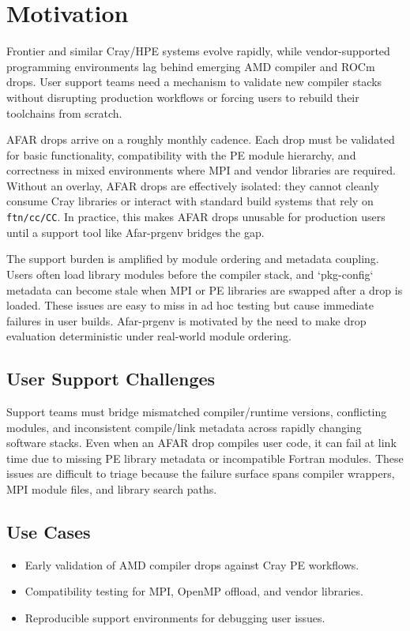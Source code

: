 \section{Motivation}
\label{sec:motivation}
Frontier and similar Cray/HPE systems evolve rapidly, while vendor-supported
programming environments lag behind emerging AMD compiler and ROCm drops. User
support teams need a mechanism to validate new compiler stacks without
disrupting production workflows or forcing users to rebuild their toolchains
from scratch.

AFAR drops arrive on a roughly monthly cadence. Each drop must be validated for
basic functionality, compatibility with the PE module hierarchy, and correctness
in mixed environments where MPI and vendor libraries are required. Without an
overlay, AFAR drops are effectively isolated: they cannot cleanly consume Cray
libraries or interact with standard build systems that rely on
\texttt{ftn/\allowbreak cc/\allowbreak CC}.
In practice, this makes AFAR drops unusable for production users until a
support tool like Afar-prgenv bridges the gap.

The support burden is amplified by module ordering and metadata coupling.
Users often load library modules before the compiler stack, and `pkg-config`
metadata can become stale when MPI or PE libraries are swapped after a drop is
loaded. These issues are easy to miss in ad hoc testing but cause immediate
failures in user builds. Afar-prgenv is motivated by the need to make drop
evaluation deterministic under real-world module ordering.

\subsection{User Support Challenges}
\label{sec:support-challenges}
Support teams must bridge mismatched compiler/runtime versions, conflicting
modules, and inconsistent compile/link metadata across rapidly changing
software stacks. Even when an AFAR drop compiles user code, it can fail at link
time due to missing PE library metadata or incompatible Fortran modules. These
issues are difficult to triage because the failure surface spans compiler
wrappers, MPI module files, and library search paths.

\subsection{Use Cases}
\label{sec:use-cases}
\begin{itemize}
  \item Early validation of AMD compiler drops against Cray PE workflows.
  \item Compatibility testing for MPI, OpenMP offload, and vendor libraries.
  \item Reproducible support environments for debugging user issues.
\end{itemize}
